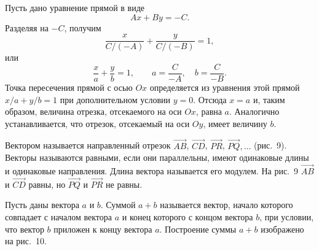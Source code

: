 \begin{rusblock}
Пусть дано уравнение прямой в виде
\[
Ax+By=-C.
\]
Разделяя на $-C$, получим
\[
\frac{x}{C/(-A)}+\frac{y}{C/(-B)}=1,
\]
или
\[
\frac{x}{a}+\frac{y}{b}=1,
\qquad a=\frac{C}{-A},\quad b=\frac{C}{-B}.
\]
Точка пересечения прямой с осью $Ox$ определяется из уравнения этой прямой $x/a+y/b=1$ при дополнительном условии $y=0$. Отсюда $x=a$ и, таким образом, величина отрезка, отсекаемого на оси $Ox$, равна $a$. Аналогично устанавливается, что отрезок, отсекаемый на оси $Oy$, имеет величину $b$.
\end{rusblock}

\begin{rusblock}
Вектором называется направленный отрезок $\overrightarrow{AB}$, $\overrightarrow{CD}$, $\overrightarrow{PR}$, $\overrightarrow{PQ},\ldots$ (рис.~9). Векторы называются равными, если они параллельны, имеют одинаковые длины и одинаковые направления. Длина вектора называется его модулем. На рис.~9 $\overrightarrow{AB}$ и $\overrightarrow{CD}$ равны, но $\overrightarrow{PQ}$ и $\overrightarrow{PR}$ не равны.
\end{rusblock}

\begin{rusblock}
Пусть даны вектора $a$ и $b$. Суммой $a+b$ называется вектор, начало которого совпадает с началом вектора $a$ и конец которого с концом вектора $b$, при условии, что вектор $b$ приложен к концу вектора $a$. Построение суммы $a+b$ изображено на рис.~10.
\end{rusblock}

